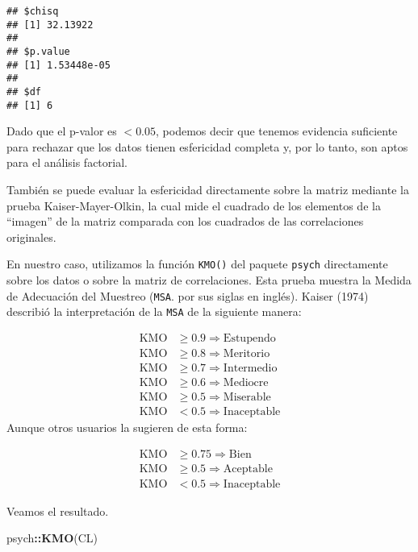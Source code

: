 \documentclass[11pt,spanish,]{article}
\newenvironment{Shaded}{\begin{snugshade}}{\end{snugshade}}
\newcommand{\KeywordTok}[1]{\textcolor[rgb]{0.13,0.29,0.53}{\textbf{#1}}}
\newcommand{\NormalTok}[1]{#1}
\newcommand{\OperatorTok}[1]{\textcolor[rgb]{0.81,0.36,0.00}{\textbf{#1}}}
\begin{document}
\begin{verbatim}
## $chisq
## [1] 32.13922
## 
## $p.value
## [1] 1.53448e-05
## 
## $df
## [1] 6
\end{verbatim}

Dado que el p-valor es \(< 0.05\), podemos decir que tenemos evidencia
suficiente para rechazar que los datos tienen esfericidad completa y,
por lo tanto, son aptos para el análisis factorial.

También se puede evaluar la esfericidad directamente sobre la matriz
mediante la prueba Kaiser-Mayer-Olkin, la cual mide el cuadrado de los
elementos de la ``imagen'' de la matriz comparada con los cuadrados de
las correlaciones originales.

En nuestro caso, utilizamos la función \texttt{KMO()} del paquete
\texttt{psych} directamente sobre los datos o sobre la matriz de
correlaciones. Esta prueba muestra la Medida de Adecuación del Muestreo
(\texttt{MSA}. por sus siglas en inglés). Kaiser (1974) describió la
interpretación de la \texttt{MSA} de la siguiente manera:

\[
\begin{align*}
\mathrm{KMO} &\geq 0.9 \Rightarrow \mathrm{Estupendo} \\
\mathrm{KMO} &\geq 0.8 \Rightarrow \mathrm{Meritorio} \\
\mathrm{KMO} &\geq 0.7 \Rightarrow \mathrm{Intermedio} \\
\mathrm{KMO} &\geq 0.6 \Rightarrow \mathrm{Mediocre} \\
\mathrm{KMO} &\geq 0.5 \Rightarrow \mathrm{Miserable} \\
\mathrm{KMO} &< 0.5 \Rightarrow \mathrm{Inaceptable}
\end{align*}
\] Aunque otros usuarios la sugieren de esta forma:

\[
\begin{align*}
\mathrm{KMO} &\geq 0.75 \Rightarrow \mathrm{Bien} \\
\mathrm{KMO} &\geq 0.5 \Rightarrow \mathrm{Aceptable} \\
\mathrm{KMO} &< 0.5 \Rightarrow \mathrm{Inaceptable}
\end{align*}
\]

Veamos el resultado.

\begin{Shaded}
\begin{Highlighting}[]
\NormalTok{psych}\OperatorTok{::}\KeywordTok{KMO}\NormalTok{(CL)}
\end{Highlighting}
\end{Shaded}
\end{document}
